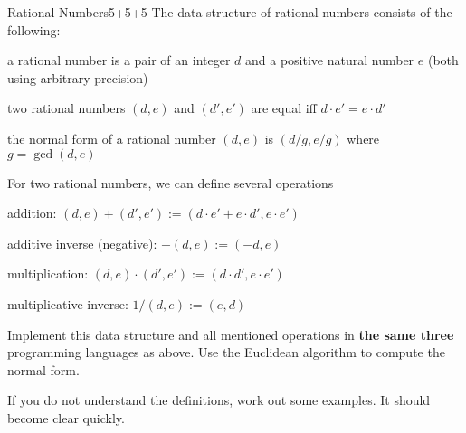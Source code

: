 \documentclass[a4paper]{article}
\begin{document}
\begin{problem}{Rational Numbers}{5+5+5}
The data structure of rational numbers consists of the following:
\begin{compactitem}
  \item a rational number is a pair of an integer $d$ and a positive natural number $e$ (both using arbitrary precision)
  \item two rational numbers $(d,e)$ and $(d',e')$ are equal iff $d\cdot e'=e\cdot d'$
  \item the normal form of a rational number $(d,e)$ is $(d/g, e/g)$ where $g=\gcd(d,e)$ \\
\end{compactitem}

For two rational numbers, we can define several operations
\begin{compactitem}
 \item addition: $(d,e)+(d',e'):=(d\cdot e'+e\cdot d', e\cdot e')$
 \item additive inverse (negative): $-(d,e):=(-d,e)$
 \item multiplication: $(d,e)\cdot(d',e'):=(d\cdot d', e\cdot e')$
 \item multiplicative inverse: $1/(d,e):=(e,d)$
\end{compactitem}

Implement this data structure and all mentioned operations in \textbf{the same three} programming languages as above.
Use the Euclidean algorithm to compute the normal form.

\begin{hint}
If you do not understand the definitions, work out some examples. It should become clear quickly.
\end{hint}
\end{problem}
\end{document}
